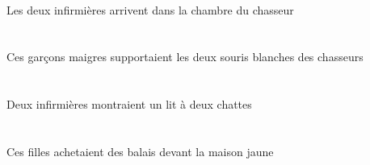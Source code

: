 \begin{exe}
\DEFDuAbsG{}   \infirmiereADuAbsG{}    \DEFSgOblG{}    \DEFSgOblG{}   \chasseurCSgOblG{}   \DEG{}   \chambreBSgOblG{}   \DANSG{}  \arriverViPrsADuG{}\\
Les deux infirmières arrivent dans la chambre du chasseur
\ex\glll
\DEMPlErg{}   \maigreDPl{}   \garconDPlErg{}   \DEFDuAbs{}    \DEFPlObl{}   \chasseurCPlObl{}   \DE{}   \blancBDu{}   \sourisBDuAbs{}  \supporterVtPstBDu{}\\
\DEMPlErgP{}   \maigreDPlP{}   \garconDPlErgP{}   \DEFDuAbsP{}    \DEFPlOblP{}   \chasseurCPlOblP{}   \DEP{}   \blancBDuP{}   \sourisBDuAbsP{}  \supporterVtPstBDuP{}\\
\DEMPlErgG{}   \maigreDPlG{}   \garconDPlErgG{}   \DEFDuAbsG{}    \DEFPlOblG{}   \chasseurCPlOblG{}   \DEG{}   \blancBDuG{}   \sourisBDuAbsG{}  \supporterVtPstBDuG{}\\
Ces garçons maigres supportaient les deux souris blanches des chasseurs
\ex\glll
\INDDuErg{}   \infirmiereADuErg{}    \INDDuDat{}   \chatDDuDat{}   \INDSgAbs{}   \litDSgAbs{}  \montrerVdPstDSg{}\\
\INDDuErgP{}   \infirmiereADuErgP{}    \INDDuDatP{}   \chatDDuDatP{}   \INDSgAbsP{}   \litDSgAbsP{}  \montrerVdPstDSgP{}\\
\INDDuErgG{}   \infirmiereADuErgG{}    \INDDuDatG{}   \chatDDuDatG{}   \INDSgAbsG{}   \litDSgAbsG{}  \montrerVdPstDSgG{}\\
Deux infirmières montraient un lit à deux chattes
\ex\glll
\DEFSgObl{}   \jauneDSg{}   \maisonDSgObl{}   \DEVANT{}   \DEMPlErg{}   \filleCPlErg{}   \INDPlAbs{}   \balaiAPlAbs{}  \acheterVtPstAPl{}\\
\DEFSgOblP{}   \jauneDSgP{}   \maisonDSgOblP{}   \DEVANTP{}   \DEMPlErgP{}   \filleCPlErgP{}   \INDPlAbsP{}   \balaiAPlAbsP{}  \acheterVtPstAPlP{}\\
\DEFSgOblG{}   \jauneDSgG{}   \maisonDSgOblG{}   \DEVANTG{}   \DEMPlErgG{}   \filleCPlErgG{}   \INDPlAbsG{}   \balaiAPlAbsG{}  \acheterVtPstAPlG{}\\
Ces filles achetaient des balais devant la maison jaune
\ex\glll
\INDSgErg{}   \NicoleBSgErg{}    \DEFPlDat{}    \DEFPlObl{}   \infirmiereAPlObl{}   \DE{}   \filleCPlDat{}   \DEFSgAbs{}    \DEFSgObl{}   \maisonDSgObl{}   \DE{}   \cuisineDSgAbs{}  \montrerVdPrsDSg{}\\
\INDSgErgP{}   \NicoleBSgErgP{}    \DEFPlDatP{}    \DEFPlOblP{}   \infirmiereAPlOblP{}   \DEP{}   \filleCPlDatP{}   \DEFSgAbsP{}    \DEFSgOblP{}   \maisonDSgOblP{}   \DEP{}   \cuisineDSgAbsP{}  \montrerVdPrsDSgP{}\\

\end{exe}
